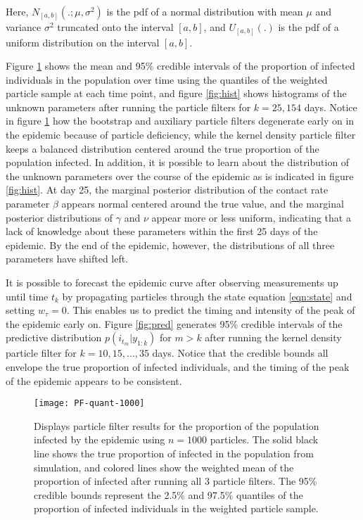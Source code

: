 \documentclass{article}
\begin{document}
\noindent Here, $N_{[a,b]}(.;\mu,\sigma^2)$ is the pdf of a normal distribution with mean $\mu$ and variance $\sigma^2$ truncated onto the interval $[a,b]$, and $U_{[a,b]}(.)$ is the pdf of a uniform distribution on the interval $[a,b]$.

Figure \ref{fig:quant} shows the mean and 95\% credible intervals of the proportion of infected individuals in the population over time using the quantiles of the weighted particle sample at each time point, and figure \ref{fig:hist} shows histograms of the unknown parameters after running the particle filters for $k = 25, 154$ days.  Notice in figure \ref{fig:quant} how the bootstrap and auxiliary particle filters degenerate early on in the epidemic because of particle deficiency, while the kernel density particle filter keeps a balanced distribution centered around the true proportion of the population infected.  In addition, it is possible to learn about the distribution of the unknown parameters over the course of the epidemic as is indicated in figure \ref{fig:hist}.  At day 25, the marginal posterior distribution of the contact rate parameter $\beta$ appears normal centered around the true value, and the marginal posterior distributions of $\gamma$ and $\nu$ appear more or less uniform, indicating that a lack of knowledge about these parameters within the first 25 days of the epidemic.  By the end of the epidemic, however, the distributions of all three parameters have shifted left.

It is possible to forecast the epidemic curve after observing measurements up until time $t_k$ by propagating particles through the state equation \eqref{eqn:state} and setting $w_\tau = 0$.  This enables us to predict the timing and intensity of the peak of the epidemic early on.  Figure \ref{fig:pred} generates 95\% credible intervals of the predictive distribution $p(i_{t_m}|y_{1:k})$ for $m > k$ after running the kernel density particle filter for $k = 10, 15, \ldots, 35$ days.  Notice that the credible bounds all envelope the true proportion of infected individuals, and the timing of the peak of the epidemic appears to be consistent.

\begin{figure}[ht]
\centering
\texttt{[image: PF-quant-1000]}
\caption{Displays particle filter results for the proportion of the population infected by the epidemic using $n = 1000$ particles.  The solid black line shows the true proportion of infected in the population from simulation, and colored lines show the weighted mean of the proportion of infected after running all 3 particle filters.  The 95\% credible bounds represent the 2.5\% and 97.5\% quantiles of the proportion of infected individuals in the weighted particle sample.} \label{fig:quant}
\end{figure}
\end{document}
